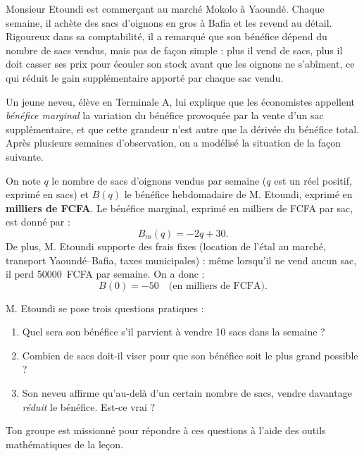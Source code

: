 \documentclass[11pt]{article}
\newcommand{\cle}[1]{{\popxbold\color{popdark}#1}}
\newcounter{popsec}
\newcounter{popsub}
\newcommand{\courssub}[1]{%
  \stepcounter{popsub}%
  \par\vspace{9pt}\noindent{\popxbold\fontsize{11.5}{13}\selectfont\color{popink}{\color{poporange}\thepopsec.\thepopsub}\hspace{6pt}#1}\par\nopagebreak\vspace{4pt}
}
\begin{document}
\courssub{Situation}

Monsieur Etoundi est commerçant au marché Mokolo à Yaoundé. Chaque semaine, il achète des sacs d'oignons en gros à Bafia et les revend au détail. Rigoureux dans sa comptabilité, il a remarqué que son bénéfice dépend du nombre de sacs vendus, mais pas de façon simple : plus il vend de sacs, plus il doit casser ses prix pour écouler son stock avant que les oignons ne s'abîment, ce qui réduit le gain supplémentaire apporté par chaque sac vendu.

Un jeune neveu, élève en Terminale A, lui explique que les économistes appellent \emph{bénéfice marginal} la variation du bénéfice provoquée par la vente d'un sac supplémentaire, et que cette grandeur n'est autre que la \cle{dérivée} du bénéfice total. Après plusieurs semaines d'observation, on a modélisé la situation de la façon suivante.

On note $q$ le nombre de sacs d'oignons vendus par semaine ($q$ est un réel positif, exprimé en sacs) et $B(q)$ le bénéfice hebdomadaire de M. Etoundi, exprimé en \textbf{milliers de FCFA}. Le bénéfice marginal, exprimé en milliers de FCFA par sac, est donné par :
\[ B_m(q) = -2q + 30. \]
De plus, M. Etoundi supporte des frais fixes (location de l'étal au marché, transport Yaoundé--Bafia, taxes municipales) : même lorsqu'il ne vend aucun sac, il perd \SI{50000}{FCFA} par semaine. On a donc :
\[ B(0) = -50 \quad \text{(en milliers de FCFA)}. \]

M. Etoundi se pose trois questions pratiques :
\begin{enumerate}
\item Quel sera son bénéfice s'il parvient à vendre 10 sacs dans la semaine ?
\item Combien de sacs doit-il viser pour que son bénéfice soit le plus grand possible ?
\item Son neveu affirme qu'au-delà d'un certain nombre de sacs, vendre davantage \emph{réduit} le bénéfice. Est-ce vrai ?
\end{enumerate}

Ton groupe est missionné pour répondre à ces questions à l'aide des outils mathématiques de la leçon.

\courssub{Consignes}
\end{document}
